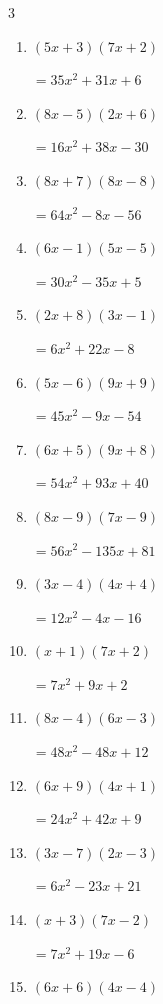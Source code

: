 \begin{multicols}{3}
\begin{enumerate}
        $=5x^{2}-36x+7$

\columnbreak %

\resetques

  \item $(5x+3)(7x+2)$

        $=35x^{2}+31x+6$

  \item $(8x-5)(2x+6)$

        $=16x^{2}+38x-30$

  \item $(8x+7)(8x-8)$

        $=64x^{2}-8x-56$

  \item $(6x-1)(5x-5)$

        $=30x^{2}-35x+5$

  \item $(2x+8)(3x-1)$

        $=6x^{2}+22x-8$

  \item $(5x-6)(9x+9)$

        $=45x^{2}-9x-54$

  \item $(6x+5)(9x+8)$

        $=54x^{2}+93x+40$

  \item $(8x-9)(7x-9)$

        $=56x^{2}-135x+81$

  \item $(3x-4)(4x+4)$

        $=12x^{2}-4x-16$

  \item $(x+1)(7x+2)$

        $=7x^{2}+9x+2$

  \item $(8x-4)(6x-3)$

        $=48x^{2}-48x+12$

  \item $(6x+9)(4x+1)$

        $=24x^{2}+42x+9$

  \item $(3x-7)(2x-3)$

        $=6x^{2}-23x+21$

  \item $(x+3)(7x-2)$

        $=7x^{2}+19x-6$

  \item $(6x+6)(4x-4)$


\end{enumerate}
\end{multicols}
